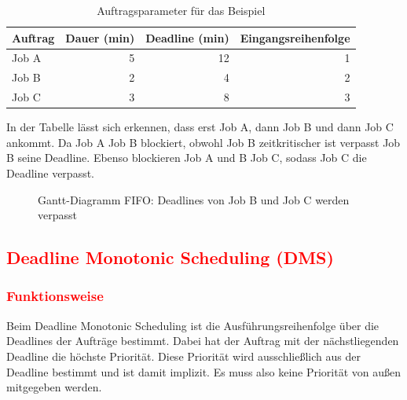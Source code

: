 \documentclass[
    12pt,               
    a4paper,            
    ngerman,            
    parskip=half,       
    headings=normal,   
    numbers=enddot,     
    toc=chapterentrywithdots 
]{scrreprt}\usepackage[utf8]{inputenc}
\begin{document}
\begin{table}[H]
\centering
{\setlength{\arrayrulewidth}{0.3pt}
\begin{tabular}{|l|r|r|r|}
    \hline
    \textbf{Auftrag} & \textbf{Dauer (min)} & \textbf{Deadline (min)} & \textbf{Eingangsreihenfolge} \\
    \hline
    Job A & 5 & 12 & 1 \\
    \hline
    Job B & 2 & 4  & 2 \\
    \hline
    Job C & 3 & 8  & 3 \\
    \hline
\end{tabular}}
\caption{Auftragsparameter für das Beispiel}
\label{tab:algo_beispiel}
\end{table}

In der Tabelle lässt sich erkennen, dass erst Job A, dann Job B und dann Job C ankommt. Da Job A Job B blockiert, obwohl Job B zeitkritischer ist verpasst Job B seine Deadline. Ebenso blockieren Job A und B Job C, sodass Job C die Deadline verpasst.

\begin{figure}[H]
\centering
{}
\caption{Gantt-Diagramm FIFO: Deadlines von Job B und Job C werden verpasst}
\label{fig:fifo_gantt}
\end{figure}

\subsection{\textcolor{red}{Deadline Monotonic Scheduling (DMS)}}
\subsubsection{\textcolor{red}{Funktionsweise}}
Beim Deadline Monotonic Scheduling ist die Ausführungsreihenfolge über die Deadlines der Aufträge bestimmt. Dabei hat der Auftrag mit der nächstliegenden Deadline die höchste Priorität.
 Diese Priorität wird ausschließlich aus der Deadline bestimmt und ist damit implizit. Es muss also keine Priorität von außen mitgegeben werden.
\end{document}
